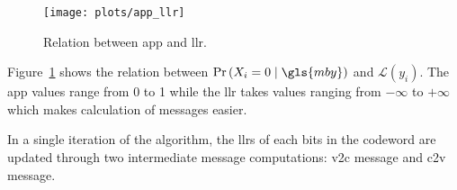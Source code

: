 \begin{figure}[htbp]
  \centering
  \texttt{[image: plots/app\_llr]}
  \caption[Relation between \acrshort{app} and \acrshort{llr}.]{Relation between \gls{app} and \gls{llr}.}
  \label{fig:app_llr}
\end{figure}

Figure~\ref{fig:app_llr} shows the relation between $\prob\left(X_i=0\mid\gls{mby}\right)$ and $\mathcal{L}(y_i)$. The \gls{app} values range from 0 to 1 while the \gls{llr} takes values ranging from $-\infty$ to $+\infty$ which makes calculation of messages easier.

In a single iteration of the algorithm, the \glspl{llr} of each bits in the codeword are updated through two intermediate message computations: \gls{v2c} message and \gls{c2v} message.
